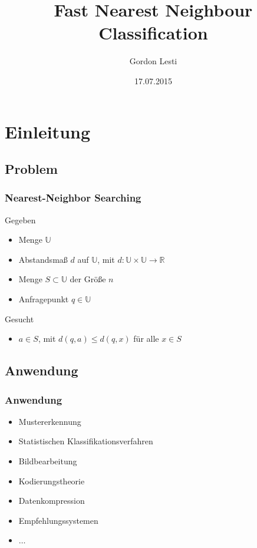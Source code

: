 \documentclass{beamer}
\begin{document}
\title{Fast Nearest Neighbour Classification}
\author{Gordon Lesti}
\date{17.07.2015}

\frame{\titlepage}

\section{Einleitung}

\subsection{Problem}
\begin{frame}
 \frametitle{Nearest-Neighbor Searching}
 \begin{block}{Gegeben}
   \begin{itemize}
    \item Menge $\mathbb{U}$
    \pause
    \item Abstandsmaß $d$ auf $\mathbb{U}$, mit $d: \mathbb{U} \times \mathbb{U} \to \mathbb{R}$
    \pause
    \item Menge $S \subset \mathbb{U}$ der Größe $n$
    \pause
    \item Anfragepunkt $q \in \mathbb{U}$
  \end{itemize}
 \end{block}
 \pause
 \begin{block}{Gesucht}
    \begin{itemize}
     \item $a \in S$, mit $d(q, a) \le d(q, x)$ f\"ur alle $x \in S$
    \end{itemize}
 \end{block}
\end{frame}

\subsection{Anwendung}
\begin{frame}
 \frametitle{Anwendung}
 \begin{itemize}
 \item Mustererkennung
 \item Statistischen Klassifikationsverfahren
 \item Bildbearbeitung
 \item Kodierungstheorie
 \item Datenkompression
 \item Empfehlungssystemen
 \item $\dots$
\end{itemize}
\end{frame}
\end{document}
